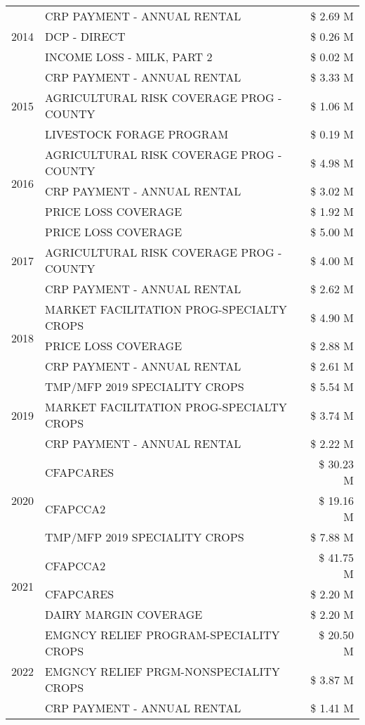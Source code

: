 \begin{tabular}{llr}
\multirow[t]{3}{*}{2014} & CRP PAYMENT - ANNUAL RENTAL & \$ 2.69 M \\
 & DCP - DIRECT & \$ 0.26 M \\
 & INCOME LOSS - MILK, PART 2 & \$ 0.02 M \\
\cline{1-3}
\multirow[t]{3}{*}{2015} & CRP PAYMENT - ANNUAL RENTAL & \$ 3.33 M \\
 & AGRICULTURAL RISK COVERAGE PROG - COUNTY & \$ 1.06 M \\
 & LIVESTOCK FORAGE PROGRAM & \$ 0.19 M \\
\cline{1-3}
\multirow[t]{3}{*}{2016} & AGRICULTURAL RISK COVERAGE PROG - COUNTY & \$ 4.98 M \\
 & CRP PAYMENT - ANNUAL RENTAL & \$ 3.02 M \\
 & PRICE LOSS COVERAGE & \$ 1.92 M \\
\cline{1-3}
\multirow[t]{3}{*}{2017} & PRICE LOSS COVERAGE & \$ 5.00 M \\
 & AGRICULTURAL RISK COVERAGE PROG - COUNTY & \$ 4.00 M \\
 & CRP PAYMENT - ANNUAL RENTAL & \$ 2.62 M \\
\cline{1-3}
\multirow[t]{3}{*}{2018} & MARKET FACILITATION PROG-SPECIALTY CROPS & \$ 4.90 M \\
 & PRICE LOSS COVERAGE & \$ 2.88 M \\
 & CRP PAYMENT - ANNUAL RENTAL & \$ 2.61 M \\
\cline{1-3}
\multirow[t]{3}{*}{2019} & TMP/MFP 2019 SPECIALITY CROPS & \$ 5.54 M \\
 & MARKET FACILITATION PROG-SPECIALTY CROPS & \$ 3.74 M \\
 & CRP PAYMENT - ANNUAL RENTAL & \$ 2.22 M \\
\cline{1-3}
\multirow[t]{3}{*}{2020} & CFAPCARES & \$ 30.23 M \\
 & CFAPCCA2 & \$ 19.16 M \\
 & TMP/MFP 2019 SPECIALITY CROPS & \$ 7.88 M \\
\cline{1-3}
\multirow[t]{3}{*}{2021} & CFAPCCA2 & \$ 41.75 M \\
 & CFAPCARES & \$ 2.20 M \\
 & DAIRY MARGIN COVERAGE & \$ 2.20 M \\
\cline{1-3}
\multirow[t]{3}{*}{2022} & EMGNCY RELIEF PROGRAM-SPECIALITY CROPS & \$ 20.50 M \\
 & EMGNCY RELIEF PRGM-NONSPECIALITY CROPS & \$ 3.87 M \\
 & CRP PAYMENT - ANNUAL RENTAL & \$ 1.41 M \\
\cline{1-3}
\bottomrule
\end{tabular}
